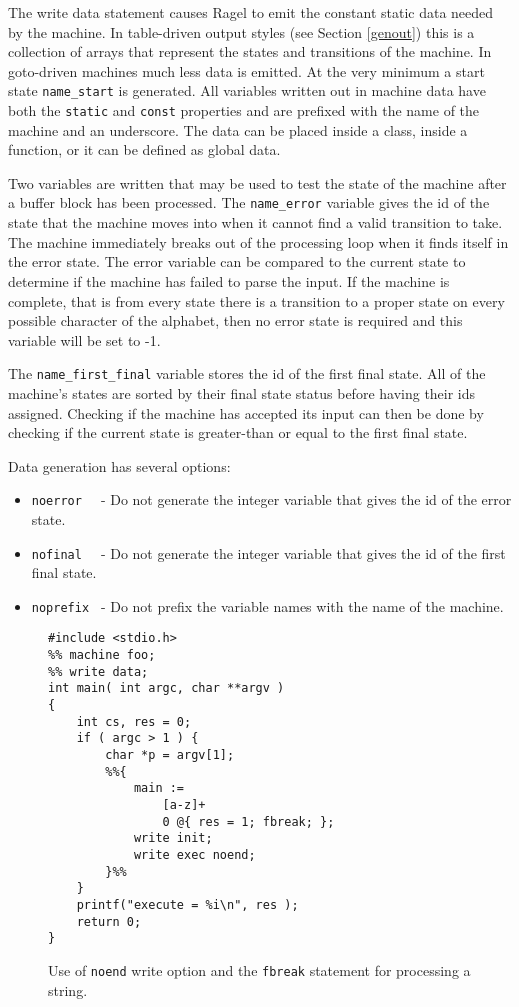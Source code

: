 \documentclass[letterpaper,11pt,oneside]{book}
\begin{document}
The write data statement causes Ragel to emit the constant static data needed
by the machine. In table-driven output styles (see Section \ref{genout}) this
is a collection of arrays that represent the states and transitions of the
machine.  In goto-driven machines much less data is emitted. At the very
minimum a start state \verb|name_start| is generated.  All variables written
out in machine data have both the \verb|static| and \verb|const| properties and
are prefixed with the name of the machine and an
underscore. The data can be placed inside a class, inside a function, or it can
be defined as global data.

Two variables are written that may be used to test the state of the machine
after a buffer block has been processed. The \verb|name_error| variable gives
the id of the state that the machine moves into when it cannot find a valid
transition to take. The machine immediately breaks out of the processing loop when
it finds itself in the error state. The error variable can be compared to the
current state to determine if the machine has failed to parse the input. If the
machine is complete, that is from every state there is a transition to a proper
state on every possible character of the alphabet, then no error state is required
and this variable will be set to -1.

The \verb|name_first_final| variable stores the id of the first final state. All of the
machine's states are sorted by their final state status before having their ids
assigned. Checking if the machine has accepted its input can then be done by
checking if the current state is greater-than or equal to the first final
state.

Data generation has several options:

\begin{itemize}
\setlength{\itemsep}{-2mm}
\item \verb|noerror  | - Do not generate the integer variable that gives the
id of the error state.
\item \verb|nofinal  | - Do not generate the integer variable that gives the
id of the first final state.
\item \verb|noprefix | - Do not prefix the variable names with the name of the
machine.
\end{itemize}

\begin{figure}
\small
\begin{verbatim}
#include <stdio.h>
%% machine foo;
%% write data;
int main( int argc, char **argv )
{
    int cs, res = 0;
    if ( argc > 1 ) {
        char *p = argv[1];
        %%{ 
            main := 
                [a-z]+ 
                0 @{ res = 1; fbreak; };
            write init;
            write exec noend;
        }%%
    }
    printf("execute = %i\n", res );
    return 0;
}
\end{verbatim}
\caption{Use of {\tt noend} write option and the {\tt fbreak} statement for
processing a string.}
\label{fbreak-example}
\end{figure}
\end{document}
